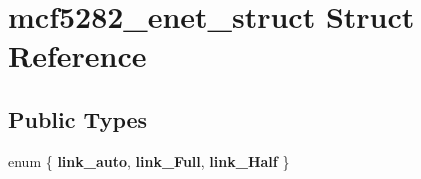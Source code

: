 \hypertarget{structmcf5282__enet__struct}{}\section{mcf5282\+\_\+enet\+\_\+struct Struct Reference}
\label{structmcf5282__enet__struct}
\subsection*{Public Types}
\begin{DoxyCompactItemize}
\item 
\mbox{\label{structmcf5282__enet__struct_ab5c59385698bf8509d84776398d19104}} 
enum \{ {\bfseries link\+\_\+auto}, 
{\bfseries link\+\_\+Full}, 
{\bfseries link\+\_\+Half}
 \}
\end{DoxyCompactItemize}
